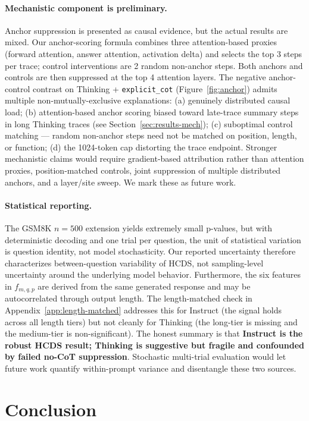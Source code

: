 \documentclass{article}
\theoremstyle{plain}
\theoremstyle{definition}
\theoremstyle{remark}
\begin{document}
\paragraph{Mechanistic component is preliminary.}
Anchor suppression is presented as causal evidence, but the actual results are mixed. Our anchor-scoring formula combines three attention-based proxies (forward attention, answer attention, activation delta) and selects the top 3 steps per trace; control interventions are 2 random non-anchor steps. Both anchors and controls are then suppressed at the top 4 attention layers. The negative anchor-control contrast on Thinking + \texttt{explicit\_cot} (Figure~\ref{fig:anchor}) admits multiple non-mutually-exclusive explanations: (a) genuinely distributed causal load; (b) attention-based anchor scoring biased toward late-trace summary steps in long Thinking traces (see Section~\ref{sec:results-mech}); (c) suboptimal control matching --- random non-anchor steps need not be matched on position, length, or function; (d) the 1024-token cap distorting the trace endpoint. Stronger mechanistic claims would require gradient-based attribution rather than attention proxies, position-matched controls, joint suppression of multiple distributed anchors, and a layer/site sweep. We mark these as future work.

\paragraph{Statistical reporting.}
The GSM8K $n=500$ extension yields extremely small p-values, but with deterministic decoding and one trial per question, the unit of statistical variation is question identity, not model stochasticity. Our reported uncertainty therefore characterizes between-question variability of HCDS, not sampling-level uncertainty around the underlying model behavior. Furthermore, the six features in $f_{m,q,p}$ are derived from the same generated response and may be autocorrelated through output length. The length-matched check in Appendix~\ref{app:length-matched} addresses this for Instruct (the signal holds across all length tiers) but not cleanly for Thinking (the long-tier is missing and the medium-tier is non-significant). The honest summary is that \textbf{Instruct is the robust HCDS result; Thinking is suggestive but fragile and confounded by failed no-CoT suppression}. Stochastic multi-trial evaluation would let future work quantify within-prompt variance and disentangle these two sources.

\section{Conclusion}
\end{document}
